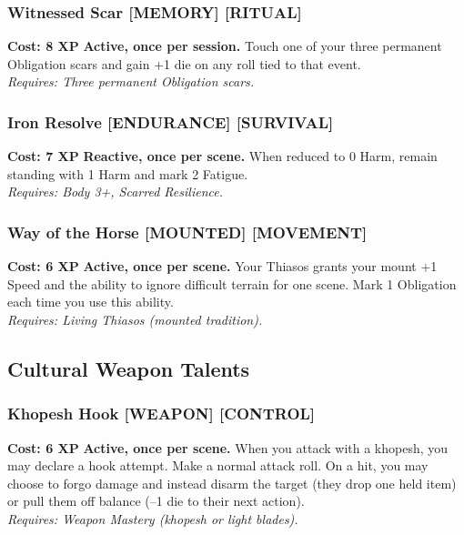 \documentclass[12pt,a4paper]{book}
\begin{document}
\subsubsection*{Witnessed Scar \textnormal{[MEMORY] [RITUAL]}}
\label{talent:witnessed-scar}
\textbf{Cost: 8 XP} \textbf{Active, once per session.} Touch one of your three permanent Obligation scars and gain +1 die on any roll tied to that event. \\
\textit{Requires: Three permanent Obligation scars.}

\subsubsection*{Iron Resolve \textnormal{[ENDURANCE] [SURVIVAL]}}
\label{talent:iron-resolve}
\textbf{Cost: 7 XP} \textbf{Reactive, once per scene.} When reduced to 0 Harm, remain standing with 1 Harm and mark 2 Fatigue. \\
\textit{Requires: Body 3+, Scarred Resilience.}

\subsubsection*{Way of the Horse \textnormal{[MOUNTED] [MOVEMENT]}}
\label{talent:way-of-the-horse}
\textbf{Cost: 6 XP} \textbf{Active, once per scene.} Your Thiasos grants your mount +1 Speed and the ability to ignore difficult terrain for one scene. Mark 1 Obligation each time you use this ability. \\
\textit{Requires: Living Thiasos (mounted tradition).}

\subsection*{Cultural Weapon Talents}
\label{sec:major-cultural-weapons}

\subsubsection*{Khopesh Hook \textnormal{[WEAPON] [CONTROL]}}
\label{talent:khopesh-hook}
\textbf{Cost: 6 XP} \textbf{Active, once per scene.} When you attack with a khopesh, you may declare a hook attempt. Make a normal attack roll. On a hit, you may choose to forgo damage and instead disarm the target (they drop one held item) or pull them off balance (--1 die to their next action). \\
\textit{Requires: Weapon Mastery (khopesh or light blades).}
\end{document}
